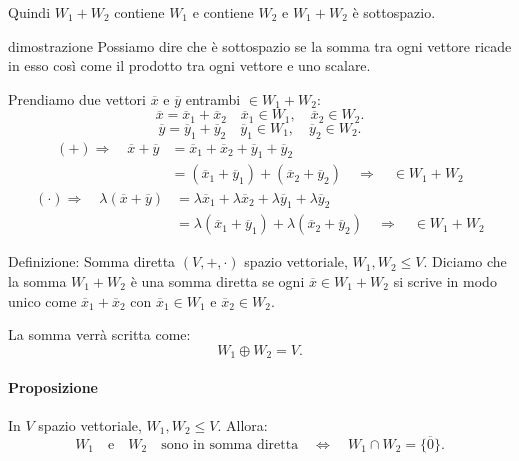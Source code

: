 \documentclass[x11names]{article}
\begin{document}
Quindi $W_1 + W_2$ contiene $W_1$ e contiene $W_2$ e $W_1 + W_2$ è sottospazio.
\begin{es}{dimostrazione}
Possiamo dire che è sottospazio se la somma tra ogni vettore ricade in esso così come il prodotto tra ogni vettore e uno scalare.

Prendiamo due vettori $\overline{x}$ e $\overline{y}$ entrambi $\in W_1 + W_2$:
\[
\overline{x} = \overline{x}_{1} + \overline{x}_{2} \quad \overline{x}_1 \in W_1, \quad \overline{x}_{2} \in W_2
.\] 
\[
\overline{y} = \overline{y}_{1} + \overline{y}_{2} \quad \overline{y}_1 \in W_1, \quad \overline{y}_{2} \in W_2
.\] 
\begin{align*}
	\left(+\right)\Rightarrow \quad \overline{x} + \overline{y} &= \overline{x}_{1} + \overline{x}_{2} + \overline{y}_{1} + \overline{y}_{2} \\
						      &= \left(\overline{x}_{1} + \overline{y}_{1}\right) + \left(\overline{x}_{2}+\overline{y}_{2}\right) \quad \Rightarrow \quad \in W_1 + W_2 
\end{align*}
\begin{align*}
	\left(\cdot\right) \Rightarrow \quad \lambda\left(\overline{x}+\overline{y}\right) &= \lambda \overline{x}_{1} + \lambda \overline{x}_{2} + \lambda \overline{y}_{1} + \lambda \overline{y}_{2} \\
						      &= \lambda\left(\overline{x}_{1} + \overline{y}_{1}\right) + \lambda\left(\overline{x}_{2}+\overline{y}_{2}\right) \quad \Rightarrow \quad \in W_1 + W_2
\end{align*}
\end{es}


\begin{center}
\colorbox{myblue}{\begin{minipage}{5.75in}
\begin{blues}{Definizione: Somma diretta}
$\left(V,+,\cdot\right)$ spazio vettoriale, $W_1,W_2 \leq V$. Diciamo che la somma $W_1+W_2$ è una somma diretta se ogni $\overline{x} \in W_1+W_2$ si scrive in modo unico come $\overline{x}_1 + \overline{x}_2$ con $\overline{x}_1 \in W_1$ e $\overline{x}_2 \in W_2 $.

La somma verrà scritta come:
\[
W_1 \oplus W_2 = V
.\] 
\end{blues}
\end{minipage}}        
\end{center}

\paragraph{Proposizione}
In $V$ spazio vettoriale, $W_1,W_2 \leq V$. Allora:
\[
W_1 \quad \text{e} \quad W_2 \quad \text{sono in somma diretta} \quad \Longleftrightarrow \quad W_1 \cap W_2 = \{\overline{0}\} 
.\] 
\end{document}

